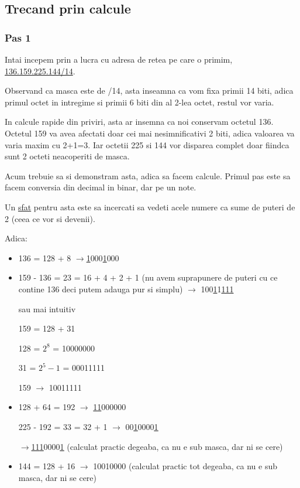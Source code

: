 \documentclass{article}
\begin{document}
\subsection{Trecand prin calcule}
\subsubsection{Pas 1}
Intai incepem prin a lucra cu adresa de retea pe care o primim, \underline{136.159.225.144/14}.

Observand ca masca este de /14, asta inseamna ca vom fixa primii 14 biti, adica primul octet in intregime si primii 6 biti din al 2-lea octet, restul vor varia.

In calcule rapide din priviri, asta ar insemna ca noi conservam octetul 136. Octetul 159 va avea afectati doar cei mai nesimnificativi 2 biti, adica valoarea va varia maxim cu 2+1=3. Iar octetii 225 si 144 vor disparea complet doar fiindca sunt 2 octeti neacoperiti de masca. 

Acum trebuie sa si demonstram asta, adica sa facem calcule. Primul pas este sa facem conversia din decimal in binar, dar pe un note.

Un \underline{sfat} pentru asta este sa incercati sa vedeti acele numere ca sume de puteri de 2 (ceea ce vor si devenii). 

Adica:
\begin{itemize}
    \item[136.]  136 = 128 + 8 
    $\rightarrow$\underline{1}000\underline{1}000

    
    \item[159.]  159 - 136 = 23 = 16 + 4 + 2 + 1 (nu avem suprapunere de puteri cu ce contine 136 deci putem adauga pur si simplu) $\rightarrow$ 100\underline{1}1\underline{111}

    sau mai intuitiv

    159 = 128 + 31

    128 = $2^{8}$ = 10000000

    31 = $2^{5} - 1$ = 00011111
    
    159 $\rightarrow$ 10011111
    
    \item[225.] 128 + 64 = 192 $\rightarrow$ \underline{11}000000

    225 - 192 = 33 = 32 + 1 $\rightarrow$ 00\underline{\underline{1}}0000\underline{\underline{1}}

    $\rightarrow$\underline{11}\underline{\underline{1}}0000\underline{\underline{1}} (calculat practic degeaba, ca nu e sub masca, dar ni se cere)

\item[144.] 144 = 128 + 16 $\rightarrow$ 10010000 (calculat practic tot degeaba, ca nu e sub masca, dar ni se cere)
\end{itemize}
\end{document}
